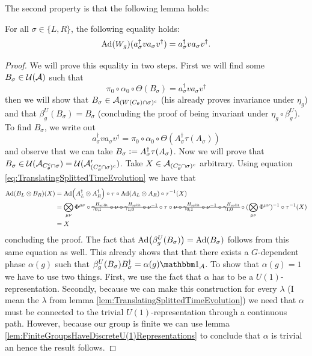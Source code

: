 \documentclass[12pt,a4paper,twoside]{article}
\numberwithin{equation}{section}
\begin{document}
The second property is that the following lemma holds:
\begin{lemma}\label{lem:EqualityTwoTranslationsUsingConnectedPath}
	For all $\sigma\in\{L,R\}$, the following equality holds:
	\begin{equation}
		\Ad{W_g}(a_\sigma^\dagger v a_\sigma v^\dagger)=a_\sigma^\dagger v a_\sigma v^\dagger.
	\end{equation}
\end{lemma}
\begin{proof}
	We will prove this equality in two steps. First we will find some $B_\sigma\in\UU(\AA)$ such that
	\begin{equation}
		\pi_0\circ\alpha_0\circ\Theta(B_\sigma)=a_\sigma^\dagger v a_\sigma v^\dagger 
	\end{equation}
	then we will show that $B_\sigma\in\AA_{(W(C_\theta)\cap\sigma)^c}$ (his already proves invariance under $\eta_g$) and that $\beta_g^{U}(B_\sigma)=B_\sigma$ (concluding the proof of being invariant under $\eta_g\circ\beta_g^U$). To find $B_\sigma$, we write out                                                                                                                                                                                                              
	\begin{equation}
		a_\sigma^\dagger v a_\sigma v^\dagger=\pi_0\circ\alpha_0\circ\Theta(A_\sigma^\dagger\tau(A_\sigma))
	\end{equation}
	and observe that we can take $B_\sigma \defeq A_\sigma^\dagger\tau(A_\sigma)$. Now we will prove that $B_\sigma\in\UU(\AA_{C_\theta^c\cap\sigma})=\UU(\AA_{(C_\theta^c\cap\sigma)^c}')$. Take $X\in\AA_{(C_\theta^c\cap\sigma)^c}$ arbitrary. Using equation \eqref{eq:TranslatingSplittedTimeEvolution} we have that
	\begin{align}
		\Ad{B_L\otimes B_R}(X)&=\Ad{A_L^\dagger\otimes A_R^\dagger}\circ\tau\circ\Ad{A_L\otimes A_R}\circ\tau^{-1}(X)\\
		&=\bigotimes_{\mu\nu}\Phi^{\mu\nu}\circ\stkout{\gamma^{H_\text{split}}_{0;1}\circ\nu\circ \gamma^{H_\text{split}}_{1;0}\circ\nu^{-1}}\circ\tau\circ\stkout{\nu\circ\gamma^{H_\text{split}}_{0;1}\circ\nu^{-1}\circ\gamma^{H_\text{split}}_{1;0}}\circ(\bigotimes_{\mu\nu}\Phi^{\mu\nu})^{-1}\circ\tau^{-1}(X)\\
		&=X
	\end{align}
	concluding the proof. The fact that $\Ad{\beta_g^{U}(B_\sigma)}=\Ad{B_\sigma}$ follows from this same equation as well. This already shows that that there exists a $G$-dependent phase $\alpha(g)$ such that $\beta_g^{U}(B_\sigma)B_\sigma^\dagger=\alpha(g)\id_\AA$. To show that $\alpha(g)=1$ we have to use two things. First, we use the fact that $\alpha$ has to be a $U(1)$-representation. Secondly, because we can make this construction for every $\lambda$ (I mean the $\lambda$ from lemma \ref{lem:TranslatingSplittedTimeEvolution}) we need that $\alpha$ must be connected to the trivial $U(1)$-representation through a continuous path. However, because our group is finite we can use lemma \ref{lem:FiniteGroupsHaveDiscreteU(1)Representations} to conclude that $\alpha$ is trivial an hence the result follows.
\end{proof}
\end{document}
